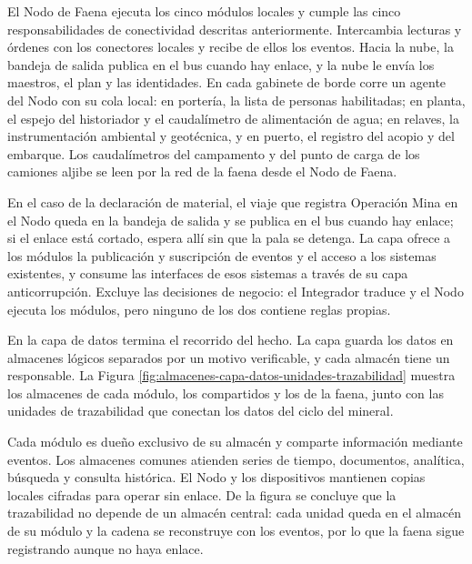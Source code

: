 \documentclass[subdoc]{../../comun/overfore}
\begin{document}
El Nodo de Faena ejecuta los cinco módulos locales y cumple las cinco responsabilidades de conectividad descritas anteriormente. Intercambia lecturas y órdenes con los conectores locales y recibe de ellos los eventos. Hacia la nube, la bandeja de salida publica en el bus cuando hay enlace, y la nube le envía los maestros, el plan y las identidades. En cada gabinete de borde corre un agente del Nodo con su cola local: en portería, la lista de personas habilitadas; en planta, el espejo del historiador y el caudalímetro de alimentación de agua; en relaves, la instrumentación ambiental y geotécnica, y en puerto, el registro del acopio y del embarque. Los caudalímetros del campamento y del punto de carga de los camiones aljibe se leen por la red de la faena desde el Nodo de Faena.

En el caso de la declaración de material, el viaje que registra Operación Mina en el Nodo queda en la bandeja de salida y se publica en el bus cuando hay enlace; si el enlace está cortado, espera allí sin que la pala se detenga. La capa ofrece a los módulos la publicación y suscripción de eventos y el acceso a los sistemas existentes, y consume las interfaces de esos sistemas a través de su capa anticorrupción. Excluye las decisiones de negocio: el Integrador traduce y el Nodo ejecuta los módulos, pero ninguno de los dos contiene reglas propias.

En la capa de datos termina el recorrido del hecho. La capa guarda los datos en almacenes lógicos separados por un motivo verificable, y cada almacén tiene un responsable. La Figura \ref{fig:almacenes-capa-datos-unidades-trazabilidad} muestra los almacenes de cada módulo, los compartidos y los de la faena, junto con las unidades de trazabilidad que conectan los datos del ciclo del mineral.

\begin{horizontal}
\end{horizontal}
Cada módulo es dueño exclusivo de su almacén y comparte información mediante eventos. Los almacenes comunes atienden series de tiempo, documentos, analítica, búsqueda y consulta histórica. El Nodo y los dispositivos mantienen copias locales cifradas para operar sin enlace. De la figura se concluye que la trazabilidad no depende de un almacén central: cada unidad queda en el almacén de su módulo y la cadena se reconstruye con los eventos, por lo que la faena sigue registrando aunque no haya enlace.
\end{document}
